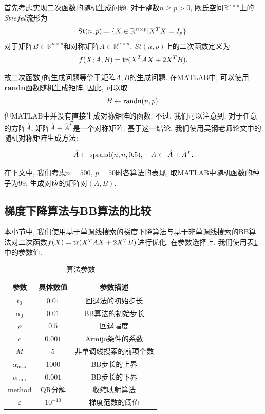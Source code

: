 \documentclass[UTF8]{ctexart}
\begin{document}
首先考虑实现二次函数的随机生成问题. 对于整数$n\geq p>0$, 欧氏空间$\mathbb{R}^{n\times p}$上的$Stiefel$流形为
\[\textup{St}(n,p)=\{X\in\mathbb{R}^{n\times p}|X^T X=I_p\}.\]
对于矩阵$B\in \mathbb{R}^{n\times p}$和对称矩阵$A\in\mathbb{R}^{n\times n}$, $St(n,p)$上的二次函数定义为
\[f(X;A,B)=\textup{tr}(X^T AX+2X^T B).\]

故二次函数$f$的生成问题等价于矩阵$A,B$的生成问题. 在MATLAB中, 可以使用\textbf{randn}函数随机生成矩阵, 因此, 可以取
\[B\leftarrow \textup{randn}(n,p).\]
但MATLAB中并没有直接生成对称矩阵的函数. 不过, 我们可以注意到, 对于任意的方阵$\hat{A}$, 矩阵$\hat{A}+\hat{A}^T$是一个对称矩阵. 基于这一结论, 我们使用吴钢老师论文中的随机对称矩阵生成方法: 

\[\hat{A}\leftarrow \textup{sprand}(n,n,0.5),\quad A\leftarrow \hat{A}+\hat{A}^T.\]

在下文中, 我们考虑$n=500$, $p=50$时各算法的表现, 取MATLAB中随机函数的种子为$99$, 生成对应的矩阵对$(A,B)$.

\subsection{梯度下降算法与BB算法的比较}

本小节中, 我们使用基于单调线搜索的梯度下降算法与基于非单调线搜索的BB算法对二次函数$f(X)=\textup{tr}(X^T AX+2X^T B)$进行优化. 在参数选择上, 我们使用表\ref{tab1} 中的参数值. 

\begin{table}[htb]
    \centering
    \begin{tabular}{c|cc}
        \hline
        \hline
        参数 & 具体数值 & 参数描述\\
        \hline
        $t_0$ & $0.01$ & 回退法的初始步长\\
        $\alpha_0$ & $0.01$ & BB算法的初始步长\\
        $\rho$ & $0.5$ & 回退幅度\\
        $c$ & $0.001$ & Armijo条件的系数\\
        $M$ & $5$ & 非单调线搜索的前项个数\\
        $\alpha_{\max}$ & $1000$ & BB步长的上界\\
        $\alpha_{\min}$ & $0.001$ & BB步长的下界\\
        method & QR分解 & 收缩映射算法\\
        $\varepsilon$ & $10^{-10}$ & 梯度范数的阈值\\
        \hline
        \hline
    \end{tabular}
    \caption{算法参数}\label{tab1}
\end{table}
\end{document}
